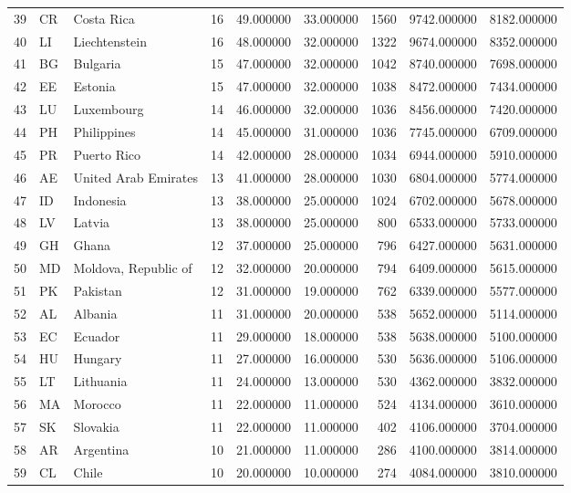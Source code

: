 \begin{tabular}{lllrrrrrr}
39 & CR & Costa Rica & 16 & 49.000000 & 33.000000 & 1560 & 9742.000000 & 8182.000000 \\
40 & LI & Liechtenstein & 16 & 48.000000 & 32.000000 & 1322 & 9674.000000 & 8352.000000 \\
41 & BG & Bulgaria & 15 & 47.000000 & 32.000000 & 1042 & 8740.000000 & 7698.000000 \\
42 & EE & Estonia & 15 & 47.000000 & 32.000000 & 1038 & 8472.000000 & 7434.000000 \\
43 & LU & Luxembourg & 14 & 46.000000 & 32.000000 & 1036 & 8456.000000 & 7420.000000 \\
44 & PH & Philippines & 14 & 45.000000 & 31.000000 & 1036 & 7745.000000 & 6709.000000 \\
45 & PR & Puerto Rico & 14 & 42.000000 & 28.000000 & 1034 & 6944.000000 & 5910.000000 \\
46 & AE & United Arab Emirates & 13 & 41.000000 & 28.000000 & 1030 & 6804.000000 & 5774.000000 \\
47 & ID & Indonesia & 13 & 38.000000 & 25.000000 & 1024 & 6702.000000 & 5678.000000 \\
48 & LV & Latvia & 13 & 38.000000 & 25.000000 & 800 & 6533.000000 & 5733.000000 \\
49 & GH & Ghana & 12 & 37.000000 & 25.000000 & 796 & 6427.000000 & 5631.000000 \\
50 & MD & Moldova, Republic of & 12 & 32.000000 & 20.000000 & 794 & 6409.000000 & 5615.000000 \\
51 & PK & Pakistan & 12 & 31.000000 & 19.000000 & 762 & 6339.000000 & 5577.000000 \\
52 & AL & Albania & 11 & 31.000000 & 20.000000 & 538 & 5652.000000 & 5114.000000 \\
53 & EC & Ecuador & 11 & 29.000000 & 18.000000 & 538 & 5638.000000 & 5100.000000 \\
54 & HU & Hungary & 11 & 27.000000 & 16.000000 & 530 & 5636.000000 & 5106.000000 \\
55 & LT & Lithuania & 11 & 24.000000 & 13.000000 & 530 & 4362.000000 & 3832.000000 \\
56 & MA & Morocco & 11 & 22.000000 & 11.000000 & 524 & 4134.000000 & 3610.000000 \\
57 & SK & Slovakia & 11 & 22.000000 & 11.000000 & 402 & 4106.000000 & 3704.000000 \\
58 & AR & Argentina & 10 & 21.000000 & 11.000000 & 286 & 4100.000000 & 3814.000000 \\
59 & CL & Chile & 10 & 20.000000 & 10.000000 & 274 & 4084.000000 & 3810.000000 \\

\end{tabular}

